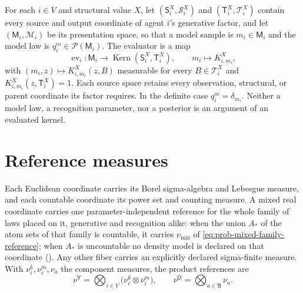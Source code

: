 For each $i\in V$ and structural value $X$, let $(\mathsf S_i^X,\mathscr S_i^X)$ and
$(\mathsf T_i^X,\mathscr T_i^X)$ contain every source and output coordinate of agent $i$'s generative
factor, and let $(\mathsf M_i,\mathscr M_i)$ be its presentation space, so that a model sample is
$m_i\in\mathsf M_i$ and the model law is $q_i^m\in\mathcal P(\mathsf M_i)$. The evaluator is a map
\begin{equation}
\operatorname{ev}_i:\mathsf M_i\longrightarrow\operatorname{Kern}(\mathsf S_i^X,\mathsf T_i^X),
\qquad
m_i\longmapsto K^X_{i,m_i},
\label{eq:prob-model-evaluation}
\end{equation}
with $(m_i,z)\mapsto K^X_{i,m_i}(z,B)$ measurable for every $B\in\mathscr T_i^X$ and
$K^X_{i,m_i}(z,\mathsf T_i^X)=1$. Each source space retains every observation, structural, or parent
coordinate its factor requires. In the definite case $q_i^m=\delta_{m_i}$. Neither a model law, a
recognition parameter, nor a posterior is an argument of an evaluated kernel.

\section{Reference measures}
\label{sec:prob-reference}

Each Euclidean coordinate carries its Borel sigma-algebra and Lebesgue measure, and each countable
coordinate its power set and counting measure. A mixed real coordinate carries one parameter-independent
reference for the whole family of laws placed on it, generative and recognition alike: when the union
$A_*$ of the atom sets of that family is countable, it carries $\nu_{\mathrm{mix}}$ of
\eqref{eq:prob-mixed-family-reference}; when $A_*$ is uncountable no density model is declared on that
coordinate (). Any other fiber carries an explicitly
declared sigma-finite measure. With $\nu_i^k,\nu_i^m,\nu_a$ the component measures, the product
references are
\begin{equation}
\nu^{\mathsf Y}=\bigotimes_{i\in V}\bigl(\nu_i^k\otimes\nu_i^m\bigr),
\qquad
\nu^{\mathsf O}=\bigotimes_{a\in\mathfrak A}\nu_a.
\label{eq:prob-reference-measures}
\end{equation}

